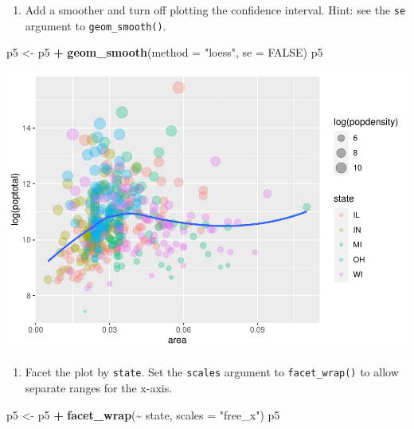 \documentclass[
]{book}
\newenvironment{Shaded}{\begin{snugshade}}{\end{snugshade}}
\newcommand{\DataTypeTok}[1]{\textcolor[rgb]{0.13,0.29,0.53}{#1}}
\newcommand{\KeywordTok}[1]{\textcolor[rgb]{0.13,0.29,0.53}{\textbf{#1}}}
\newcommand{\NormalTok}[1]{#1}
\newcommand{\OperatorTok}[1]{\textcolor[rgb]{0.81,0.36,0.00}{\textbf{#1}}}
\newcommand{\OtherTok}[1]{\textcolor[rgb]{0.56,0.35,0.01}{#1}}
\newcommand{\StringTok}[1]{\textcolor[rgb]{0.31,0.60,0.02}{#1}}
\providecommand{\tightlist}{%
  \setlength{\itemsep}{0pt}\setlength{\parskip}{0pt}}
\begin{document}
\begin{alert}
\begin{enumerate}
\def\labelenumi{\arabic{enumi}.}
\setcounter{enumi}{2}
\tightlist
\item
  Add a smoother and turn off plotting the confidence interval. Hint: see the \texttt{se} argument to \texttt{geom\_smooth()}.
\end{enumerate}

\begin{Shaded}
\begin{Highlighting}[]
\NormalTok{p5 \textless{}{-}}\StringTok{ }\NormalTok{p5 }\OperatorTok{+}\StringTok{ }\KeywordTok{geom\_smooth}\NormalTok{(}\DataTypeTok{method =} \StringTok{"loess"}\NormalTok{, }\DataTypeTok{se =} \OtherTok{FALSE}\NormalTok{) }
\NormalTok{p5}
\end{Highlighting}
\end{Shaded}

\includegraphics{R/Rgraphics/figures/unnamed-chunk-230-1.pdf}

\begin{enumerate}
\def\labelenumi{\arabic{enumi}.}
\setcounter{enumi}{3}
\tightlist
\item
  Facet the plot by \texttt{state}. Set the \texttt{scales} argument to \texttt{facet\_wrap()} to allow separate ranges for the x-axis.
\end{enumerate}

\begin{Shaded}
\begin{Highlighting}[]
\NormalTok{p5 \textless{}{-}}\StringTok{ }\NormalTok{p5 }\OperatorTok{+}\StringTok{ }\KeywordTok{facet\_wrap}\NormalTok{(}\OperatorTok{\textasciitilde{}}\StringTok{ }\NormalTok{state, }\DataTypeTok{scales =} \StringTok{"free\_x"}\NormalTok{)}
\NormalTok{p5}
\end{Highlighting}
\end{Shaded}


\end{alert}
\end{document}
